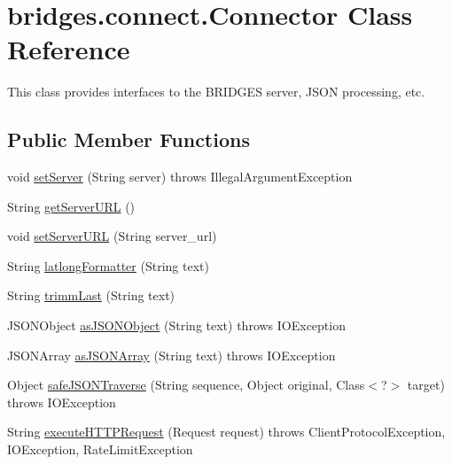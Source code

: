 \hypertarget{classbridges_1_1connect_1_1_connector}{}\section{bridges.\+connect.\+Connector Class Reference}
\label{classbridges_1_1connect_1_1_connector}


This class provides interfaces to the B\+R\+I\+D\+G\+ES server, J\+S\+ON processing, etc.  


\subsection*{Public Member Functions}
\begin{DoxyCompactItemize}
\item 
void \mbox{\hyperlink{classbridges_1_1connect_1_1_connector_acab24a8c4ffd3349ec67536552fb30b3}{set\+Server}} (String server)  throws Illegal\+Argument\+Exception 
\item 
String \mbox{\hyperlink{classbridges_1_1connect_1_1_connector_a0b9809180aac96a83e31e224ab5ed6ec}{get\+Server\+U\+RL}} ()
\item 
void \mbox{\hyperlink{classbridges_1_1connect_1_1_connector_a71f449c91e529f79730df27e01fdf674}{set\+Server\+U\+RL}} (String server\+\_\+url)
\item 
String \mbox{\hyperlink{classbridges_1_1connect_1_1_connector_a2318cd93d18ef58285598f6f9cdf727b}{latlong\+Formatter}} (String text)
\item 
String \mbox{\hyperlink{classbridges_1_1connect_1_1_connector_ac0dca0bd99b6abbbd8a77874a95e6d49}{trimm\+Last}} (String text)
\item 
J\+S\+O\+N\+Object \mbox{\hyperlink{classbridges_1_1connect_1_1_connector_aac3fb75dd7975c4439cfd1bf6cefe0a6}{as\+J\+S\+O\+N\+Object}} (String text)  throws I\+O\+Exception 
\item 
J\+S\+O\+N\+Array \mbox{\hyperlink{classbridges_1_1connect_1_1_connector_aa5bd647713545fa24c6d730eacb6bc54}{as\+J\+S\+O\+N\+Array}} (String text)  throws I\+O\+Exception 
\item 
Object \mbox{\hyperlink{classbridges_1_1connect_1_1_connector_ab7d1d242fbf9acade316650e54a3d020}{safe\+J\+S\+O\+N\+Traverse}} (String sequence, Object original, Class$<$?$>$ target)  throws I\+O\+Exception 
\item 
String \mbox{\hyperlink{classbridges_1_1connect_1_1_connector_aabcfde23d155c8c42edb8a1407320bc5}{execute\+H\+T\+T\+P\+Request}} (Request request)  throws Client\+Protocol\+Exception, I\+O\+Exception, Rate\+Limit\+Exception 

\end{DoxyCompactItemize}
